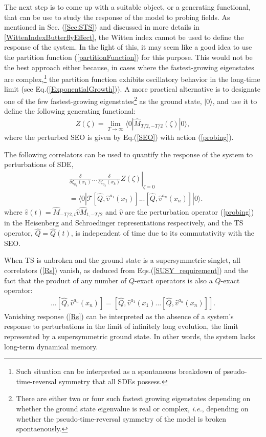 \documentclass[final,5p,10pt,times,twocolumn,year]{elsarticle}
\begin{document}
The next step is to come up with a suitable object, or a generating functional, that can be use to study the response of the model to probing fields. As mentioned in Sec. (\ref{Sec:STS}) and discussed in more details in \ref{WittenIndexButterflyEffect}, the Witten index cannot be used to define the response of the system. In the light of this, it may seem like a good idea to use the partition function (\ref{partitionFunction}) for this purpose. This would not be the best approach either because, in cases where the fastest-growing eigenstates are complex,\footnote{Such situation can be interpreted as a spontaneous breakdown of pseudo-time-reversal symmetry that all SDEs possess.} the partition function exhibits oscillatory behavior in the long-time limit (see Eq.(\ref{ExponentialGrowth})). A more practical alternative is to designate one of the few fastest-growing eigenstates\footnote{There are either two or four such fastest growing eigenstates depending on whether the ground state eigenvalue is real or complex, \emph{i.e.}, depending on whether the pseudo-time-reversal symmetry of the model is broken spontaenously.}  as the ground state, $|0\rangle$, and use it to define the following generating functional:
\begin{eqnarray}
    Z(\zeta) = \lim_{T\to\infty}\langle 0 | \hat M_{T/2, -T/2}(\zeta)| 0 \rangle,\label{generatingFunctional_eta}
\end{eqnarray}
where the perturbed SEO is given by Eq.(\ref{SEO}) with action (\ref{probing}).

The following correlators can be used to quantify the response of the system to perturbations of SDE,
\begin{eqnarray}
&\left.\frac{\delta}{\delta \zeta_{a_1}(x_1)}...\frac{\delta}{\delta \zeta_{a_k}(x_k)} Z(\zeta)\right|_{\zeta=0} \nonumber \\& = \langle 0| \mathcal{T} [\hat Q,\hat v^{a_1}(x_1)] ... [\hat Q,\hat v^{a_n}(x_n)]|0\rangle. \label{Rs}
\end{eqnarray}
where $\hat v(t) = \hat M_{-T/2,t}\hat v\hat M_{t,-T/2}$ and $\hat v$ are the perturbation operator (\ref{probing}) in the Heisenberg and Schroedinger representations respectively, and the TS operator, $\hat Q=\hat Q(t)$, is independent of time due to its commutativity with the SEO.

When TS is unbroken and the ground state is a supersymmetric singlet, all correlators (\ref{Rs}) vanish, as deduced from Eqs.(\ref{SUSY_requirement}) and the fact that the product of any number of $Q$-exact operators is also a $Q$-exact operator:
\begin{eqnarray}
    [\hat Q,\hat v^{a_1}(x_1)] ... [\hat Q,\hat v^{a_n}(x_n)] =  [\hat Q,\hat v^{a_1}(x_1) ... [\hat Q,\hat v^{a_n}(x_n)]].\label{Qexactnessofproduct}
\end{eqnarray}
Vanishing response (\ref{Rs}) can be interpreted as the absence of a system's response to perturbations in the limit of infinitely long evolution, the limit represented by a supersymmetric ground state. In other words, the system lacks long-term dynamical memory. 
\end{document}

